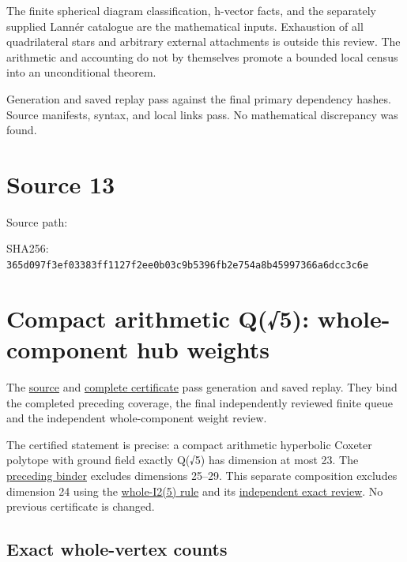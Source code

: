 \documentclass[
  10pt,
]{report}
\begin{document}
The finite spherical diagram classification, h-vector facts, and the
separately supplied Lannér catalogue are the mathematical inputs.
Exhaustion of all quadrilateral stars and arbitrary external attachments
is outside this review. The arithmetic and accounting do not by
themselves promote a bounded local census into an unconditional theorem.

Generation and saved replay pass against the final primary dependency
hashes. Source manifests, syntax, and local links pass. No mathematical
discrepancy was found.

\clearpage

\chapter{Source 13}\label{source-13}

Source path: 

SHA256:
\nolinkurl{365d097f3ef03383ff1127f2ee0b03c9b5396fb2e754a8b45997366a6dcc3c6e}

\chapter{Compact arithmetic Q(√5): whole-component hub
weights}\label{compact-arithmetic-q5-whole-component-hub-weights}

The
\href{../scripts/fresh_sqrt5_dimension23_coverage_20261015.py}{source}
and \href{fresh_sqrt5_dimension23_coverage_20261015.json}{complete
certificate} pass generation and saved replay. They bind the completed
preceding coverage, the final independently reviewed finite queue and
the independent whole-component weight review.

The certified statement is precise: a compact arithmetic hyperbolic
Coxeter polytope with ground field exactly Q(√5) has dimension at most
23. The \href{fresh_sqrt5_dimension24_coverage_20261015.md}{preceding
binder} excludes dimensions 25--29. This separate composition excludes
dimension 24 using the
\href{fresh_sqrt5_dimension24_i25_cross_20261015.md}{whole-I2(5) rule}
and its
\href{fresh_sqrt5_dimension24_i25_cross_20261015_review.md}{independent
exact review}. No previous certificate is changed.

\section{Exact whole-vertex counts}\label{exact-whole-vertex-counts}
\end{document}
